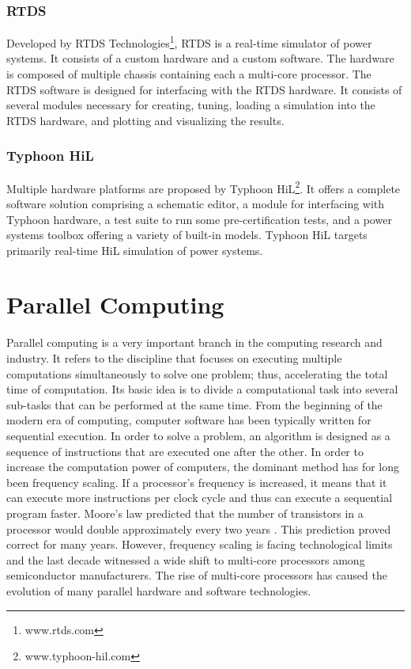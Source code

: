 \subsubsection{RTDS}

Developed by RTDS Technologies\footnote{www.rtds.com}, RTDS is a real-time simulator of power systems. It consists of a custom hardware and a custom software. The hardware is composed of multiple chassis containing each a multi-core processor. The RTDS software is designed for interfacing with the RTDS hardware. It consists of several modules necessary for creating, tuning, loading a simulation into the RTDS hardware, and plotting and visualizing the results.

\subsubsection{Typhoon HiL}

Multiple hardware platforms are proposed by Typhoon HiL\footnote{www.typhoon-hil.com}. It offers a complete software solution comprising a schematic editor, a module for interfacing with Typhoon hardware, a test suite to run some pre-certification tests, and a power systems toolbox offering a variety of built-in models. Typhoon HiL targets primarily real-time HiL simulation of power systems. 


\section{Parallel Computing}

Parallel computing is a very important branch in the computing research and industry. It refers to the discipline that focuses on executing multiple computations simultaneously to solve one problem; thus, accelerating the total time of computation. Its basic idea is to divide a computational task into several sub-tasks that can be performed at the same time. From the beginning of the modern era of computing, computer software has been typically written for sequential execution. In order to solve a problem, an algorithm is designed as a sequence of instructions that are executed one after the other. In order to increase the computation power of computers, the dominant method has for long been frequency scaling. If a processor's frequency is increased, it means that it can execute more instructions per clock cycle and thus can execute a sequential program faster. Moore's law predicted that the number of transistors in a processor would double approximately every two years \cite{moore:1965}. This prediction proved correct for many years. However, frequency scaling is facing technological limits and the last decade witnessed a wide shift to multi-core processors among semiconductor manufacturers. %
The rise of multi-core processors has caused the evolution of many parallel hardware and software technologies.

